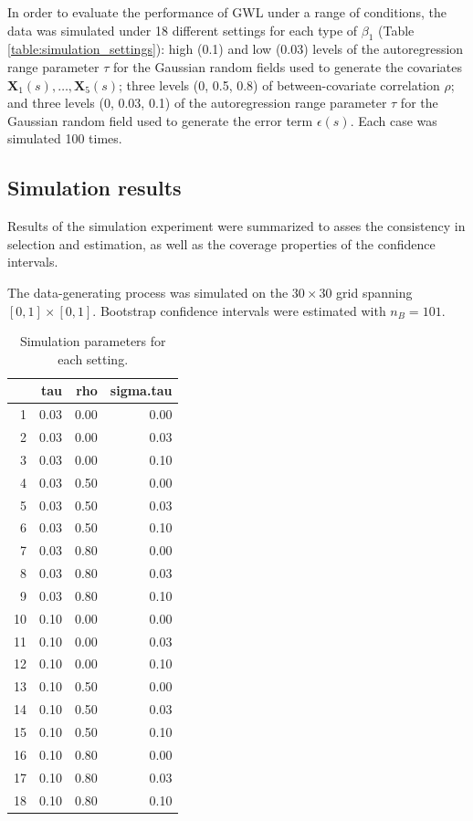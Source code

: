 \documentclass[authoryear, review, 11pt]{elsarticle}
\begin{document}
	In order to evaluate the performance of GWL under a range of conditions, the data was simulated under 18 different settings for each type of $\beta_1$ (Table \ref{table:simulation_settings}): high (0.1) and low (0.03) levels of the autoregression range parameter $\tau$ for the Gaussian random fields used to generate the covariates $\bm{X}_1(s), \dots, \bm{X}_5(s)$; three levels (0, 0.5, 0.8) of between-covariate correlation $\rho$; and three levels (0, 0.03, 0.1) of the autoregression range parameter $\tau$ for the Gaussian random field used to generate the error term $\epsilon(s)$. Each case was simulated 100 times.\\
	
	\subsection{Simulation results}
	Results of the simulation experiment were summarized to asses the consistency in selection and estimation, as well as the coverage properties of the confidence intervals.
			
	The data-generating process was simulated on the $30 \times 30$ grid spanning $[0,1] \times [0,1]$. Bootstrap confidence intervals were estimated with $n_B = 101$.
	
\begin{table}[h!]
\begin{center}
\begin{tabular}{rrrr}
  \hline
 & tau & rho & sigma.tau \\ 
  \hline
  1 & 0.03 & 0.00 & 0.00 \\ 
  2 & 0.03 & 0.00 & 0.03 \\ 
  3 & 0.03 & 0.00 & 0.10 \\ 
  4 & 0.03 & 0.50 & 0.00 \\ 
  5 & 0.03 & 0.50 & 0.03 \\ 
  6 & 0.03 & 0.50 & 0.10 \\ 
  7 & 0.03 & 0.80 & 0.00 \\ 
  8 & 0.03 & 0.80 & 0.03 \\ 
  9 & 0.03 & 0.80 & 0.10 \\ 
  10 & 0.10 & 0.00 & 0.00 \\ 
  11 & 0.10 & 0.00 & 0.03 \\ 
  12 & 0.10 & 0.00 & 0.10 \\ 
  13 & 0.10 & 0.50 & 0.00 \\ 
  14 & 0.10 & 0.50 & 0.03 \\ 
  15 & 0.10 & 0.50 & 0.10 \\ 
  16 & 0.10 & 0.80 & 0.00 \\ 
  17 & 0.10 & 0.80 & 0.03 \\ 
  18 & 0.10 & 0.80 & 0.10 \\ 
  \hline
\end{tabular}
\end{center}
\caption{Simulation parameters for each setting.}
\end{table}
	
\end{document}

